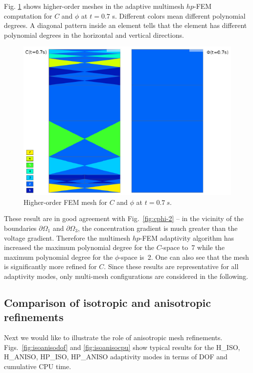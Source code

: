 \noindent 
Fig. \ref{fig:poly} shows higher-order meshes in the adaptive multimesh $hp$-FEM
computation for $C$ and $\phi$ at $t = 0.7$ s. Different 
colors mean different polynomial degrees. A diagonal pattern inside an element 
tells that the element has different polynomial degrees in the 
horizontal and vertical directions. 


\begin{figure}[!ht]
  \begin{centering}
  \includegraphics[width=.75\columnwidth]{poly}
  \caption{\label{fig:poly} Higher-order FEM mesh for 
  $C$ and $\phi$ at $t=0.7\ s$. }
  \end{centering}
\end{figure}

These result are in good agreement with Fig.~\ref{fig:cphi-2} -- in the vicinity
of the boundaries $\partial \Omega_1$ and $\partial\Omega_3$, the concentration gradient
is much greater than the voltage gradient. Therefore the multimesh $hp$-FEM adaptivity 
algorithm has increased the maximum polynomial degree for the $C$-space to~7 while 
the maximum polynomial degree for the $\phi$-space is~2. One can also see that the mesh 
is significantly more refined for $C$.
Since these results are representative for all adaptivity modes, only multi-mesh 
configurations are considered in the following. 

\subsection{Comparison of isotropic and anisotropic refinements}

Next we would like to illustrate the role of anisotropic mesh refinements.
Figs.~\ref{fig:isoanisodof} and \ref{fig:isoanisocpu} show typical results 
for the H\_ISO, H\_ANISO, HP\_ISO, HP\_ANISO adaptivity modes in terms 
of DOF and cumulative CPU time.


